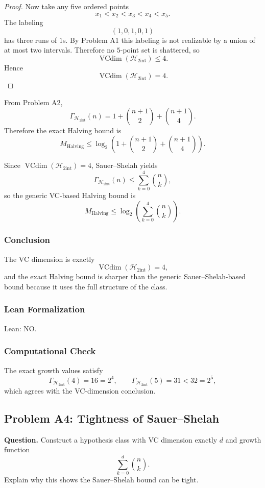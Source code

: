 \documentclass{article}
\newcommand{\vcdim}{\operatorname{VCdim}}
\newcommand{\growth}{\Gamma}
\newcommand{\classA}{\mathcal{H}_{2\mathrm{int}}}
\begin{document}
\begin{solutionbox}
\begin{proof}
Now take any five ordered points
\[
x_1<x_2<x_3<x_4<x_5.
\]
The labeling
\[
(1,0,1,0,1)
\]
has three runs of \(1\)s. By Problem A1 this labeling is not realizable by a
union of at most two intervals. Therefore no \(5\)-point set is shattered, so
\[
\vcdim(\classA)\le 4.
\]
Hence
\[
\vcdim(\classA)=4.
\]
\end{proof}

From Problem A2,
\[
\growth_{\classA}(n)=1+\binom{n+1}{2}+\binom{n+1}{4}.
\]
Therefore the exact Halving bound is
\[
M_{\mathrm{Halving}}
\le
\log_2\!\left(1+\binom{n+1}{2}+\binom{n+1}{4}\right).
\]

Since \(\vcdim(\classA)=4\), Sauer--Shelah yields
\[
\growth_{\classA}(n)\le \sum_{k=0}^4 \binom{n}{k},
\]
so the generic VC-based Halving bound is
\[
M_{\mathrm{Halving}}
\le
\log_2\!\left(\sum_{k=0}^4 \binom{n}{k}\right).
\]

\subsubsection{Conclusion}

The VC dimension is exactly
\[
\vcdim(\classA)=4,
\]
and the exact Halving bound is sharper than the generic Sauer--Shelah-based
bound because it uses the full structure of the class.

\subsubsection{Lean Formalization}

Lean: NO.

\subsubsection{Computational Check}

The exact growth values satisfy
\[
\growth_{\classA}(4)=16=2^4,
\qquad
\growth_{\classA}(5)=31<32=2^5,
\]
which agrees with the VC-dimension conclusion.

\end{solutionbox}

\subsection{Problem A4: Tightness of Sauer--Shelah}

\textbf{Question.}
\newline
Construct a hypothesis class with VC dimension exactly \(d\) and growth function
\[
\sum_{k=0}^{d}\binom{n}{k}.
\]
Explain why this shows the Sauer--Shelah bound can be tight.
\end{document}

